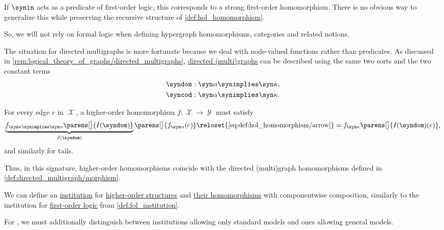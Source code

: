 \begin{example}
\begin{thmenum}
    If \( {\synin} \) acts as a predicate of first-order logic, this corresponds to a strong first-order homomorphism. There is no obvious way to generalize this while preserving the recursive structure of \cref{def:hol_homomorphism}.

    So, we will not rely on formal logic when defining hypergraph homomorphisms, categories and related notions.

     The situation for directed multigraphs is more fortunate because we deal with node-valued functions rather than predicates. As discussed in \cref{rem:logical_theory_of_graphs/directed_multigraphs}, \hyperref[def:directed_multigraph]{directed (multi)graphs} can be described using the same two sorts and the two constant terms
    \begin{align*}
      \syndom&: \syn\alpha \synimplies \syn\kappa, \\
      \syncod&: \syn\alpha \synimplies \syn\kappa.
    \end{align*}

    For every edge \( e \) in \( \mscrX \), a higher-order homomorphism \( f: \mscrX \to \mscrY \) must satisfy
    \begin{equation*}
      \underbrace{f_{\syn\kappa \synimplies \syn\alpha} \parens[\big]{ I(\syndom) }}_{J(\syndom)} \parens[\big]{ f_{\syn\alpha}(e) }
      \reloset {\eqref{eq:def:hol_homomorphism/arrow}} =
      f_{\syn\kappa} \parens[\big]{ I(\syndom)(e) },
    \end{equation*}
    and similarly for tails.

    Thus, in this signature, higher-order homomorphisms coincide with the directed (multi)graph homomorphisms defined in \cref{def:directed_multigraph/morphism}.
  \end{thmenum}
\end{example}

\begin{definition}\label{def:hol_institution}\mimprovised
  We can define an \hyperref[def:institution]{institution} for \hyperref[def:hol_structure]{higher-order structures} and \hyperref[def:hol_homomorphism]{their homomorphisms} with componentwise composition, similarly to the institution for \hyperref[def:first_order_logic]{first-order logic} from \cref{def:fol_institution}.

  For , we must additionally distinguish between institutions allowing only standard models and ones allowing general models.
\end{definition}

